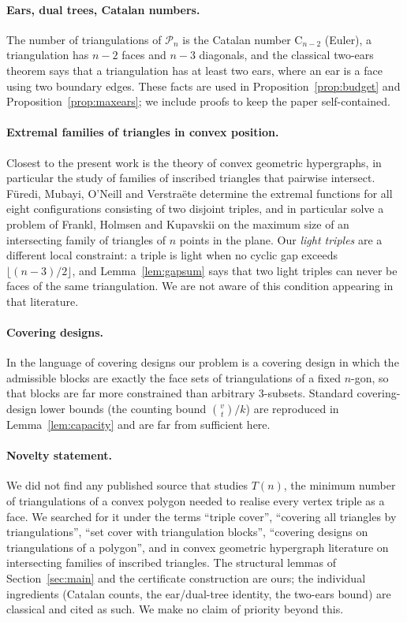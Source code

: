 \documentclass[11pt,a4paper]{article}
\theoremstyle{definition}
\newcommand{\Pol}{\mathcal{P}}
\newcommand{\Cat}{\mathrm{C}}
\begin{document}
\paragraph{Ears, dual trees, Catalan numbers.}
The number of triangulations of $\Pol_n$ is the Catalan number $\Cat_{n-2}$ (Euler),
a triangulation has $n-2$ faces and $n-3$ diagonals, and the classical two-ears
theorem says that a triangulation has at least two ears, where an ear is a face
using two boundary edges. These facts are used in
Proposition~\ref{prop:budget} and Proposition~\ref{prop:maxears}; we include
proofs to keep the paper self-contained.

\paragraph{Extremal families of triangles in convex position.}
Closest to the present work is the theory of convex geometric hypergraphs, in
particular the study of families of inscribed triangles that pairwise intersect.
Füredi, Mubayi, O'Neill and Verstraëte \cite{furedietal2020} determine the
extremal functions for all eight configurations consisting of two disjoint
triples, and in particular solve a problem of Frankl, Holmsen and Kupavskii on
the maximum size of an intersecting family of triangles of $n$ points in the
plane. Our \emph{light triples} are a different local constraint: a triple is
light when no cyclic gap exceeds $\lfloor (n-3)/2 \rfloor$, and
Lemma~\ref{lem:gapsum} says that two light triples can never be faces of the
same triangulation. We are not aware of this condition appearing in that
literature.

\paragraph{Covering designs.}
In the language of covering designs \cite{colbourndinitz} our problem is a
covering design in which the admissible blocks are exactly the face sets of
triangulations of a fixed $n$-gon, so that blocks are far more constrained than
arbitrary $3$-subsets. Standard covering-design lower bounds (the counting bound
$\binom{v}{t}/k$) are reproduced in Lemma~\ref{lem:capacity} and are far from
sufficient here.

\paragraph{Novelty statement.}
We did not find any published source that studies $T(n)$, the minimum number of
triangulations of a convex polygon needed to realise every vertex triple as a
face. We searched for it under the terms ``triple cover'', ``covering all
triangles by triangulations'', ``set cover with triangulation blocks'',
``covering designs on triangulations of a polygon'', and in convex geometric
hypergraph literature on intersecting families of inscribed triangles. The
structural lemmas of Section~\ref{sec:main} and the certificate construction are
ours; the individual ingredients (Catalan counts, the ear/dual-tree identity, the
two-ears bound) are classical and cited as such. We make no claim of priority
beyond this.
\end{document}
